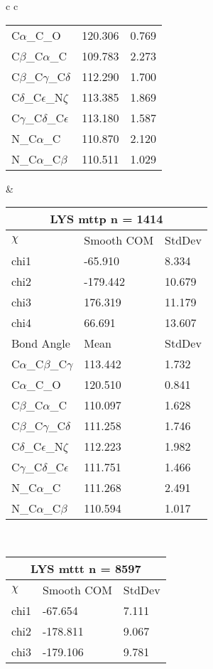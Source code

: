 \begin{longtable}{ c c }
\begin{tabular}{ l l l }
  C$\alpha$\_C\_O & 120.306 & 0.769\\
  C$\beta$\_C$\alpha$\_C & 109.783 & 2.273\\
  C$\beta$\_C$\gamma$\_C$\delta$ & 112.290 & 1.700\\
  C$\delta$\_C$\epsilon$\_N$\zeta$ & 113.385 & 1.869\\
  C$\gamma$\_C$\delta$\_C$\epsilon$ & 113.180 & 1.587\\
  N\_C$\alpha$\_C & 110.870 & 2.120\\
  N\_C$\alpha$\_C$\beta$ & 110.511 & 1.029\\
  \bottomrule
  \end{tabular}
  &
  \begin{tabular}{ l l l }
  \toprule
  \multicolumn{3}{c}{LYS \textbf{mttp} n = 1414} \\ \toprule
  $\chi$       & Smooth COM & StdDev \\ \midrule
  chi1 & -65.910 & 8.334 \\ 
  chi2 & -179.442 & 10.679 \\ 
  chi3 & 176.319 & 11.179 \\ 
  chi4 & 66.691 & 13.607 \\ \midrule
  Bond Angle   & Mean     & StdDev \\ \midrule
  C$\alpha$\_C$\beta$\_C$\gamma$ & 113.442 & 1.732\\
  C$\alpha$\_C\_O & 120.510 & 0.841\\
  C$\beta$\_C$\alpha$\_C & 110.097 & 1.628\\
  C$\beta$\_C$\gamma$\_C$\delta$ & 111.258 & 1.746\\
  C$\delta$\_C$\epsilon$\_N$\zeta$ & 112.223 & 1.982\\
  C$\gamma$\_C$\delta$\_C$\epsilon$ & 111.751 & 1.466\\
  N\_C$\alpha$\_C & 111.268 & 2.491\\
  N\_C$\alpha$\_C$\beta$ & 110.594 & 1.017\\
  \bottomrule
  \end{tabular}
  \\
  \begin{tabular}{ l l l }
  \toprule
  \multicolumn{3}{c}{LYS \textbf{mttt} n = 8597} \\ \toprule
  $\chi$       & Smooth COM & StdDev \\ \midrule
  chi1 & -67.654 & 7.111 \\ 
  chi2 & -178.811 & 9.067 \\ 
  chi3 & -179.106 & 9.781 \\ 

\end{tabular}
\end{longtable}
